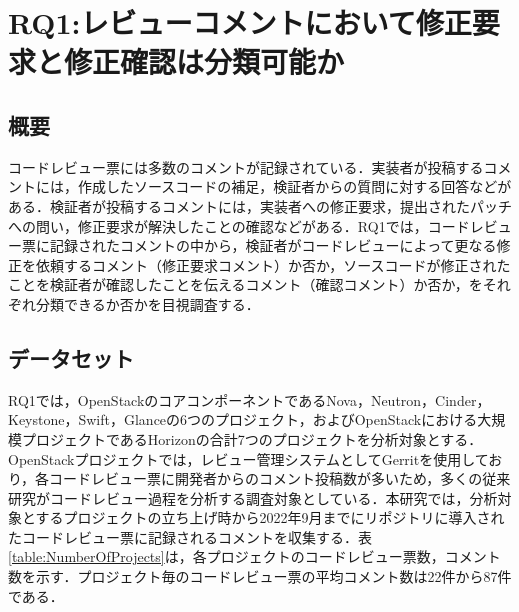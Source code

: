 \documentclass[submit,techrep,noauthor]{ipsj}
\newcommand{\RQOne}{レビューコメントにおいて修正要求と修正確認は分類可能か}
\begin{document}
\section{RQ1:\RQOne}\label{sec:RQ1}

\subsection{概要}
コードレビュー票には多数のコメントが記録されている．実装者が投稿するコメントには，作成したソースコードの補足，検証者からの質問に対する回答などがある．検証者が投稿するコメントには，実装者への修正要求，提出されたパッチへの問い，修正要求が解決したことの確認などがある．RQ1では，コードレビュー票に記録されたコメントの中から，検証者がコードレビューによって更なる修正を依頼するコメント（修正要求コメント）か否か，ソースコードが修正されたことを検証者が確認したことを伝えるコメント（確認コメント）か否か，をそれぞれ分類できるか否かを目視調査する．

\subsection{データセット}
RQ1では，OpenStackのコアコンポーネントであるNova，Neutron，Cinder，Keystone，Swift，Glanceの6つのプロジェクト，およびOpenStackにおける大規模プロジェクトであるHorizonの合計7つのプロジェクトを分析対象とする．OpenStackプロジェクトでは，レビュー管理システムとしてGerritを使用しており，各コードレビュー票に開発者からのコメント投稿数が多いため，多くの従来研究がコードレビュー過程を分析する調査対象としている．本研究では，分析対象とするプロジェクトの立ち上げ時から2022年9月までにリポジトリに導入されたコードレビュー票に記録されるコメントを収集する．表\ref{table:NumberOfProjects}は，各プロジェクトのコードレビュー票数，コメント数を示す．プロジェクト毎のコードレビュー票の平均コメント数は22件から87件である．

\begin{table}[t]
\centering
  \caption{各プロジェクトにおいて導入されたコードレビュー票数とコメント数}
  \vspace{+1mm}
  \label{table:NumberOfProjects}
\end{table}
\end{document}
